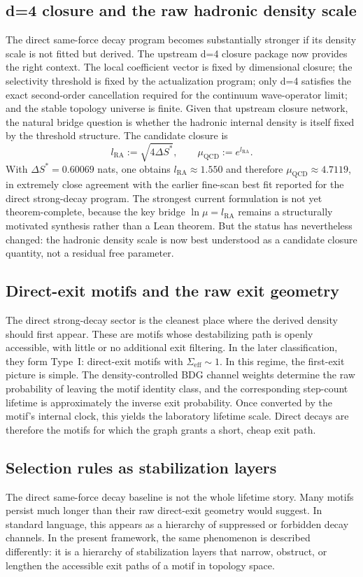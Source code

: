 \documentclass[11pt]{article}
\begin{document}
\subsection{d=4 closure and the raw hadronic density scale}
The direct same-force decay program becomes substantially stronger if its density scale is not fitted but derived. The upstream d=4 closure package now provides the right context. The local coefficient vector is fixed by dimensional closure; the selectivity threshold is fixed by the actualization program; only d=4 satisfies the exact second-order cancellation required for the continuum wave-operator limit; and the stable topology universe is finite. Given that upstream closure network, the natural bridge question is whether the hadronic internal density is itself fixed by the threshold structure. The candidate closure is
\[
l_{\mathrm{RA}}:=\sqrt{4\Delta S^*}, \qquad
\mu_{\mathrm{QCD}}:=e^{l_{\mathrm{RA}}}.
\]
With $\Delta S^*=0.60069$ nats, one obtains $l_{\mathrm{RA}}\approx 1.550$ and therefore $\mu_{\mathrm{QCD}}\approx 4.7119$, in extremely close agreement with the earlier fine-scan best fit reported for the direct strong-decay program. The strongest current formulation is not yet theorem-complete, because the key bridge $\ln\mu = l_{\mathrm{RA}}$ remains a structurally motivated synthesis rather than a Lean theorem. But the status has nevertheless changed: the hadronic density scale is now best understood as a candidate closure quantity, not a residual free parameter.

\subsection{Direct-exit motifs and the raw exit geometry}
The direct strong-decay sector is the cleanest place where the derived density should first appear. These are motifs whose destabilizing path is openly accessible, with little or no additional exit filtering. In the later classification, they form Type~I: direct-exit motifs with $\Sigma_{\mathrm{eff}}\sim 1$. In this regime, the first-exit picture is simple. The density-controlled BDG channel weights determine the raw probability of leaving the motif identity class, and the corresponding step-count lifetime is approximately the inverse exit probability. Once converted by the motif's internal clock, this yields the laboratory lifetime scale. Direct decays are therefore the motifs for which the graph grants a short, cheap exit path.

\subsection{Selection rules as stabilization layers}\label{subsec:stabilization-layers}
The direct same-force decay baseline is not the whole lifetime story. Many motifs persist much longer than their raw direct-exit geometry would suggest. In standard language, this appears as a hierarchy of suppressed or forbidden decay channels. In the present framework, the same phenomenon is described differently: it is a hierarchy of stabilization layers that narrow, obstruct, or lengthen the accessible exit paths of a motif in topology space.
\end{document}
